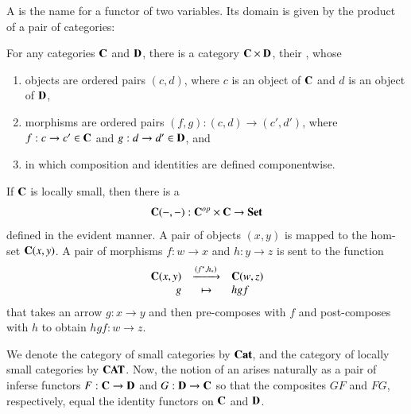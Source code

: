\documentclass[12pt, a4paper, oneside, openright, titlepage]{book}
\begin{document}
A  is the name for a functor of two variables. Its domain is given by the product of a pair of categories: 

\begin{defn}
    For any categories $\normalfont\textbf{C}$ and $\normalfont\textbf{D}$, there is a category $\normalfont\textbf{C}\times \normalfont\textbf{D}$, their , whose \begin{enumerate}
        \item objects are ordered pairs $(c,d)$, where $c$ is an object of $\normalfont\textbf{C}$ and $d$ is an object of $\normalfont\textbf{D}$,
        \item morphisms are ordered pairs $(f,g):(c,d)\rightarrow (c',d')$, where $f:c\rightarrow c' \in \normalfont\textbf{C}$ and $g:d\rightarrow d' \in \normalfont\textbf{D}$, and 
        \item in which composition and identities are defined componentwise.
    \end{enumerate}
\end{defn}

\begin{defn}
    If $\normalfont\textbf{C}$ is locally small, then there is a  \begin{equation*}
        \normalfont\textbf{C}(-,-):\normalfont\textbf{C}^{op}\times\normalfont\textbf{C}\rightarrow \normalfont\textbf{Set}
    \end{equation*}
    defined in the evident manner. A pair of objects $(x,y)$ is mapped to the hom-set $\normalfont\textbf{C}(x,y)$. A pair of morphisms $f:w\rightarrow x$ and $h:y\rightarrow z$ is sent to the function \begin{equation*}
        \begin{array}{rcl} \normalfont\textbf{C}(x,y) & \xrightarrow{(f^*,h_*)} & \normalfont\textbf{C}(w,z) \\ g & \mapsto & hgf \end{array}
    \end{equation*}
    that takes an arrow $g:x\rightarrow y$ and then pre-composes with $f$ and post-composes with $h$ to obtain $hgf:w\rightarrow z$.
\end{defn}


We denote the category of small categories by $\normalfont\textbf{Cat}$, and the category of locally small categories by $\normalfont\textbf{CAT}$. Now, the notion of an  arises naturally as a pair of inferse functors $F:\normalfont\textbf{C}\rightarrow \normalfont\textbf{D}$ and $G:\normalfont\textbf{D}\rightarrow \normalfont\textbf{C}$ so that the composites $GF$ and $FG$, respectively, equal the identity functors on $\normalfont\textbf{C}$ and $\normalfont\textbf{D}$.
\end{document}
